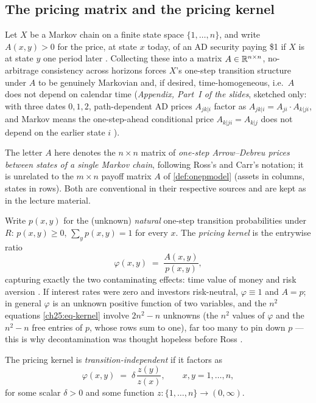 \begin{paracol}{2}
\section{The pricing matrix and the pricing kernel}\label{ch25:sec-kernel}

Let $X$ be a Markov chain on a finite state space $\{1,\dots,n\}$, and write $A(x,y)>0$ for the price, at
state $x$ today, of an AD security paying \$1 if $X$ is at state $y$ one period later .
Collecting these into a matrix $A\in\mathbb{R}^{n\times n}$, no-arbitrage consistency across horizons forces $X$'s
one-step transition structure under $A$ to be genuinely Markovian and, if desired, time-homogeneous, i.e.\
$A$ does not depend on calendar time (\emph{Appendix, Part~I of the slides}, sketched only: with three
dates $0,1,2$, path-dependent AD prices $A_{jk|i}$ factor as $A_{jk|i}=A_{ji}\cdot A_{k|ji}$, and Markov
means the one-step-ahead conditional price $A_{k|ji}=A_{k|j}$ does not depend on the earlier state $i$
\ts{13}{25}{39:23}).

\begin{coursenote}
The letter $A$ here denotes the $n\times n$ matrix of \emph{one-step Arrow--Debreu prices between states of
a single Markov chain}, following Ross's and Carr's notation; it is unrelated to the $m\times n$ payoff
matrix $A$ of \cref{def:onepmodel} (assets in columns, states in rows). Both are conventional in their
respective sources and are kept as in the lecture material.
\end{coursenote}

Write $p(x,y)$ for the (unknown) \emph{natural} one-step transition probabilities under $R$: $p(x,y)\ge0$,
$\sum_yp(x,y)=1$ for every $x$. The \emph{pricing kernel} is the entrywise ratio
\begin{equation}\label{ch25:eq-kernel}
  \varphi(x,y) \;=\; \frac{A(x,y)}{p(x,y)},
\end{equation}
capturing exactly the two contaminating effects: time value of money and risk aversion
\ts{13}{25}{47:03}. If interest rates were zero and investors risk-neutral, $\varphi\equiv1$ and $A=p$;
in general $\varphi$ is an unknown positive function of two variables, and the $n^2$ equations \eqref{ch25:eq-kernel} involve
$2n^2-n$ unknowns (the $n^2$ values of $\varphi$ and the $n^2-n$ free entries of $p$, whose rows sum to one),
far too many to pin down $p$ --- this is why decontamination was thought hopeless before Ross
\ts{13}{25}{47:03}.

\begin{definition}\label{ch25:def-ti}
The pricing kernel is \emph{transition-independent} if it factors as
\begin{equation}\label{ch25:eq-ti}
  \varphi(x,y) \;=\; \delta\,\frac{z(y)}{z(x)}, \qquad x,y=1,\dots,n,
\end{equation}
for some scalar $\delta>0$ and some function $z:\{1,\dots,n\}\to(0,\infty)$.
\end{definition}


\end{paracol}
